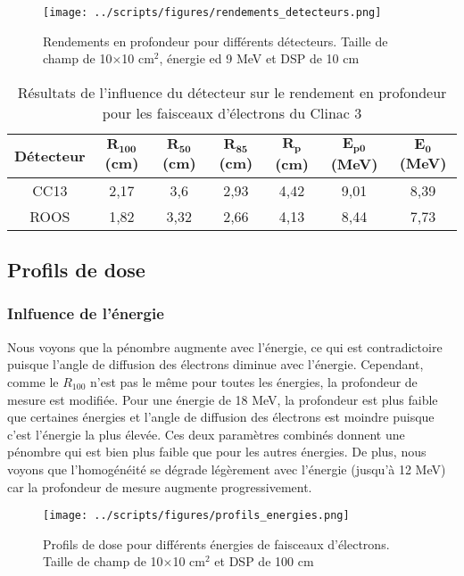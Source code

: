 \documentclass{article}
\begin{document}
\begin{figure}[h!]
  \centering
  \texttt{[image: ../scripts/figures/rendements\_detecteurs.png]}
  \caption{Rendements en profondeur pour différents détecteurs. Taille de champ de 10$\times$10 cm$^2$, énergie ed 9 MeV et DSP de 10 cm}
  \label{fig_rdt_detecteur}
\end{figure}

\begin{table}[h]
  \centering
  \begin{tabular}{ccccccc}
  \toprule
  \textbf{Détecteur} & $\mathbf{R_{100}}$ \textbf{(cm)} & $\mathbf{R_{50}}$ \textbf{(cm)} & $\mathbf{R_{85}}$ \textbf{(cm)} & $\mathbf{R_p}$ \textbf{(cm)} & $\mathbf{E_{p0}}$ \textbf{(MeV)} & $\mathbf{E_0}$ \textbf{(MeV)} \\ \toprule
  CC13 & 2,17 & 3,6 & 2,93 & 4,42 & 9,01 & 8,39 \\
  ROOS & 1,82 & 3,32 & 2,66 & 4,13 & 8,44 & 7,73 \\ \bottomrule
  \end{tabular}
  \caption[short]{Résultats de l'influence du détecteur sur le rendement en profondeur pour les faisceaux d'électrons du Clinac 3}
  \label{table_rdt_detecteurs}
\end{table}

\subsection{Profils de dose}
\subsubsection{Inlfuence de l'énergie}

Nous voyons que la pénombre augmente avec l'énergie, ce qui est contradictoire puisque l'angle de diffusion des électrons diminue avec l'énergie. Cependant, comme le $R_{100}$ n'est pas le même pour toutes les énergies, la profondeur de mesure est modifiée. Pour une énergie de 18 MeV, la profondeur est plus faible que certaines énergies et l'angle de diffusion des électrons est moindre puisque c'est l'énergie la plus élevée. Ces deux paramètres combinés donnent une pénombre qui est bien plus faible que pour les autres énergies. De plus, nous voyons que l'homogénéité se dégrade légèrement avec l'énergie (jusqu'à 12 MeV) car la profondeur de mesure augmente progressivement.


\begin{figure}[h]
  \centering
  \texttt{[image: ../scripts/figures/profils\_energies.png]}
  \caption{Profils de dose pour différents énergies de faisceaux d'électrons. Taille de champ de 10$\times$10 cm$^2$ et DSP de 100 cm}
  \label{fig_profil_energie}
\end{figure}
\end{document}
